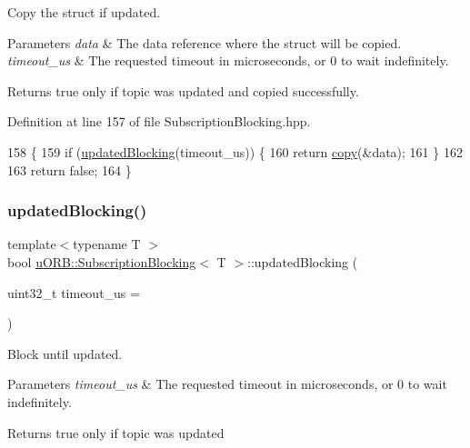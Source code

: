 Copy the struct if updated. 
\begin{DoxyParams}{Parameters}
{\em data} & The data reference where the struct will be copied. \\
\hline
{\em timeout\+\_\+us} & The requested timeout in microseconds, or 0 to wait indefinitely.\\
\hline
\end{DoxyParams}
\begin{DoxyReturn}{Returns}
true only if topic was updated and copied successfully. 
\end{DoxyReturn}


Definition at line 157 of file Subscription\+Blocking.\+hpp.


\begin{DoxyCode}
158     \{
159         \textcolor{keywordflow}{if} (\hyperlink{classuORB_1_1SubscriptionBlocking_af6a2f560b911949ed11eabc0cfad7874}{updatedBlocking}(timeout\_us)) \{
160             \textcolor{keywordflow}{return} \hyperlink{classuORB_1_1SubscriptionInterval_a25125ed09772665d3b4b4e6978fb3e1c}{copy}(&data);
161         \}
162 
163         \textcolor{keywordflow}{return} \textcolor{keyword}{false};
164     \}
\end{DoxyCode}
\mbox{\label{classuORB_1_1SubscriptionBlocking_af6a2f560b911949ed11eabc0cfad7874}} 
\subsubsection{\texorpdfstring{updated\+Blocking()}{updatedBlocking()}}
{\footnotesize\ttfamily template$<$typename T $>$ \\
bool \hyperlink{classuORB_1_1SubscriptionBlocking}{u\+O\+R\+B\+::\+Subscription\+Blocking}$<$ T $>$\+::updated\+Blocking (\begin{DoxyParamCaption}\item[{uint32\+\_\+t}]{timeout\+\_\+us = {} }\end{DoxyParamCaption})\hspace{0.3cm}{\ttfamily [inline]}}

Block until updated. 
\begin{DoxyParams}{Parameters}
{\em timeout\+\_\+us} & The requested timeout in microseconds, or 0 to wait indefinitely.\\
\hline
\end{DoxyParams}
\begin{DoxyReturn}{Returns}
true only if topic was updated 
\end{DoxyReturn}


